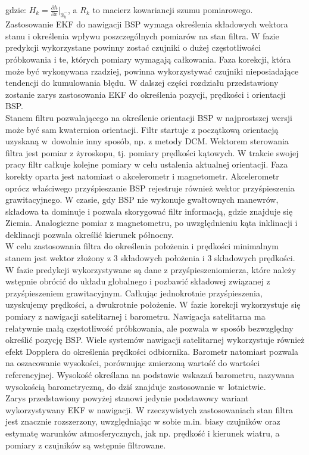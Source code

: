 gdzie: $H_k = \frac{\partial h}{\partial x}\Bigr|_{\hat{x}_k^-}$, a $R_k$ to macierz kowariancji szumu pomiarowego.
\\

Zastosowanie EKF do nawigacji BSP wymaga określenia składowych wektora stanu i określenia wpływu poszczególnych pomiarów na stan filtra. W fazie predykcji wykorzystane powinny zostać czujniki o dużej częstotliwości próbkowania i te, których pomiary wymagają całkowania. Faza korekcji, która może być wykonywana rzadziej, powinna wykorzystywać czujniki nieposiadające tendencji do kumulowania błędu. W dalszej części rozdziału przedstawiony zostanie zarys zastosowania EKF do określenia pozycji, prędkości i orientacji BSP.\\

Stanem filtru pozwalającego na określenie orientacji BSP w najprostszej wersji może być sam kwaternion orientacji. Filtr startuje z początkową orientacją uzyskaną w~dowolnie inny sposób, np. z metody DCM. Wektorem sterowania filtra jest pomiar z żyroskopu, tj. pomiary prędkości kątowych. W trakcie swojej pracy filtr całkuje kolejne pomiary w celu ustalenia aktualnej orientacji. Faza korekty oparta jest natomiast o akcelerometr i magnetometr. Akcelerometr oprócz właściwego przyśpieszanie BSP rejestruje również wektor przyśpieszenia grawitacyjnego. W czasie, gdy BSP nie wykonuje gwałtownych manewrów, składowa ta dominuje i pozwala skorygować filtr informacją, gdzie znajduje się Ziemia. Analogiczne pomiar z magnetometru, po uwzględnieniu kąta inklinacji i deklinacji pozwala określić kierunek północny.\\

W celu zastosowania filtra do określenia położenia i prędkości minimalnym stanem jest wektor złożony z 3 składowych położenia i 3 składowych prędkości. W fazie predykcji wykorzystywane są dane z przyśpieszeniomierza, które należy wstępnie obrócić do układu globalnego i pozbawić składowej związanej z przyśpieszeniem grawitacyjnym. Całkując jednokrotnie przyśpieszenia, uzyskujemy prędkości, a dwukrotnie położenie. W fazie korekcji wykorzystuje się pomiary z nawigacji satelitarnej i barometru. Nawigacja satelitarna ma relatywnie małą częstotliwość próbkowania, ale pozwala w sposób bezwzględny określić pozycję BSP. Wiele systemów nawigacji satelitarnej wykorzystuje również efekt Dopplera do określenia prędkości odbiornika. Barometr natomiast pozwala na oszacowanie wysokości, porównując zmierzoną wartość do wartości referencyjnej. Wysokość określana na podstawie wskazań barometru, nazywana wysokością barometryczną, do dziś znajduje zastosowanie w~lotnictwie.\\

Zarys przedstawiony powyżej stanowi jedynie podstawowy wariant wykorzystywany EKF w nawigacji. W rzeczywistych zastosowaniach stan filtra jest znacznie rozszerzony, uwzględniając w sobie m.in. biasy czujników oraz estymatę warunków atmosferycznych, jak np. prędkość i kierunek wiatru, a pomiary z czujników są wstępnie filtrowane.


